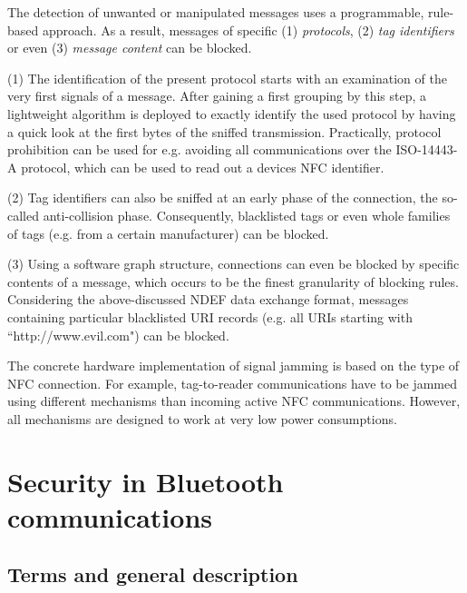 \documentclass[12pt,a4paper]{article}
\begin{document}
The detection of unwanted or manipulated messages uses a programmable, rule-based approach. As a result, messages of specific (1) \emph{protocols}, (2) \emph{tag identifiers} or even (3) \emph{message content} can be blocked.

(1) The identification of the present protocol starts with an examination of the very first signals of a message. After gaining a first grouping by this step, a lightweight algorithm is deployed to exactly identify the used protocol by having a quick look at the first bytes of the sniffed transmission. Practically, protocol prohibition can be used for e.g. avoiding all communications over the ISO-14443-A protocol, which can be used to read out a devices NFC identifier.

(2) Tag identifiers can also be sniffed at an early phase of the connection, the so-called anti-collision phase. Consequently, blacklisted tags or even whole families of tags (e.g. from a certain manufacturer) can be blocked.

(3) Using a software graph structure, connections can even be blocked by specific contents of a message, which occurs to be the finest granularity of blocking rules. Considering the above-discussed NDEF data exchange format, messages containing particular blacklisted URI records (e.g. all URIs starting with ``http://www.evil.com") can be blocked.

The concrete hardware implementation of signal jamming is based on the type of NFC connection. For example, tag-to-reader communications have to be jammed using different mechanisms than incoming active NFC communications. However, all mechanisms are designed to work at very low power consumptions.

\section{Security in Bluetooth communications}
\subsection{Terms and general description}
\end{document}
